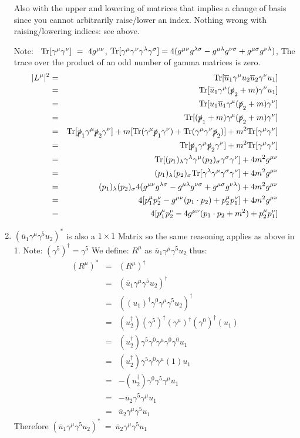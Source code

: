 \documentclass[12pt]{article}
\def \bea{\begin{eqnarray}}
\def \eea{\end{eqnarray}}
\def \Tr{{\rm Tr}}
\def \nn{\nonumber}
\def \nl{\nn \\}
\def \ou{\overline{u}}
\def \ga{\gamma}
\def \la{\lambda}
\def \si{\sigma}
\def \cre{\color{red}}
\begin{document}
\begin{enumerate}
Also with the upper and lowering of matrices that implies a change of basis since you cannot arbitrarily raise/lower an index.
{\cre Nothing wrong with raising/lowering indices: see above.}

\bigskip
Note: ~$\Tr[\ga^\mu\ga^\nu]~=~4 g^{\mu\nu}$, $\Tr[\ga^\mu \ga^\nu \ga^\la \ga^\si]= 4(g^{\mu\nu}g^{\la\si} - g^{\mu\la} g^{\nu\si} + g^{\mu\si}g^{\nu\la})$, The trace over the product of an odd number of gamma matrices is zero.
\bea
|L^{\mu}|^2 &=& \Tr[\ou_1 \ga^\mu u_2 \ou_2 \ga^\nu u_1] \nl
&=& \Tr[\ou_1 \ga^\mu (\slashed{p}_2+m) \ga^\nu u_1]\nl
&=& \Tr[u_1\ou_1 \ga^\mu (\slashed{p}_2+m) \ga^\nu]\nl
&=& \Tr[(\slashed{p}_1+m) \ga^\mu (\slashed{p}_2+m) \ga^\nu]\nl
&=& \Tr[\slashed{p}_1\ga^\mu \slashed{p}_2 \ga^\nu] + m[\Tr(\ga^\mu \slashed{p}_1\ga^\nu) + \Tr(\ga^\mu \ga^\nu \slashed{p}_2)] + m^2\Tr[\ga^\mu \ga^\nu]\nl
&=& \Tr[\slashed{p}_1\ga^\mu \slashed{p}_2 \ga^\nu] + m^2\Tr[\ga^\mu \ga^\nu]\nl
&=& \Tr[(p_1)_\la\ga^\la \ga^\mu (p_2)_\si\ga^\si \ga^\nu  ] + 4m^2g^{\mu\nu}\nl
&=& (p_1)_\la (p_2)_\si \Tr[\ga^\la \ga^\mu\ga^\si \ga^\nu  ] + 4m^2g^{\mu\nu}\nl
&=& (p_1)_\la(p_2)_\si 4(g^{\mu\nu}g^{\la\si} - g^{\mu\la} g^{\nu\si} + g^{\mu\si}g^{\nu\la}) + 4m^2g^{\mu\nu}\nl
&=& 4[p_1^\mu p_2^\nu - g^{\mu\nu}(p_1 \cdot p_2) + p_2^\mu p_1^\nu] + 4m^2g^{\mu\nu} \nl
&=& 4[p_1^\mu p_2^\nu - 4g^{\mu\nu}(p_1 \cdot p_2 + m^2) + p_2^\mu p_1^\nu]
\eea

\item $(\ou_1\ga^\mu \ga^5 u_2)^*$ is also a $1\times1$ Matrix so the same reasoning applies as above in 1. Note: $(\ga^5)^\dag = \ga^5$
We define: $R^\mu$ as $\ou_1\ga^\mu\ga^5 u_2$ thus:
\bea
(R^\mu)^* &=& (R^\mu)^\dag \nl
&=&(\ou_1\ga^\mu\ga^5 u_2)^\dag \nl
&=& ((u_1)^\dag\ga^0\ga^\mu\ga^5 u_2)^\dag \nl
&=& (u_2^\dag)(\ga^5)^\dag(\ga^\mu)^\dag(\ga^0)^\dag(u_1) \nl
&=& (u_2^\dag)\ga^5\ga^0\ga^\mu\ga^0\ga^0 u_1 \nl
&=& (u_2^\dag)\ga^5\ga^0\ga^\mu(1) u_1 \nl
&=& -(u_2^\dag)\ga^0\ga^5\ga^\mu u_1 \nl
&=& -\ou_2\ga^5\ga^\mu u_1 \nl
&=& \ou_2\ga^\mu\ga^5 u_1
\eea
%
Therefore $(\ou_1\ga^\mu \ga^5 u_2)^*~=~\ou_2 \ga^\mu \ga^5 u_1$


\end{enumerate}
\end{document}
